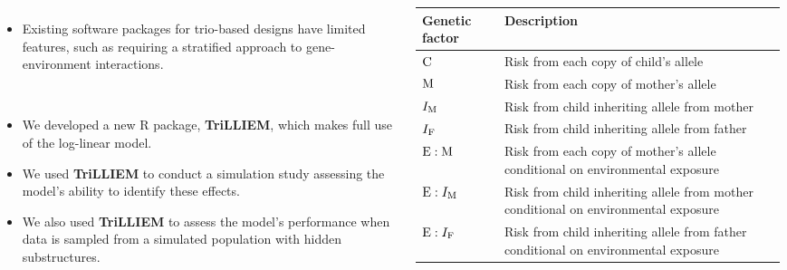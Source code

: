 \documentclass[25pt]{tikzposter}
\newcommand{\MM}{{\rm M}}
\newcommand{\FF}{{\rm F}}
\newcommand{\CC}{{\rm C}}
\newcommand{\EE}{{\rm E}}
\begin{document}
\begin{columns}
{ \vspace{-0.5em}
		\begin{itemize}
			\item \begin{minipage}[t]{0.7\linewidth} Existing software packages for trio-based designs have limited features, such as requiring a stratified approach to gene-environment interactions.\end{minipage} \\
			\item We developed a new \textsf{R} package, \textbf{TriLLIEM}, which makes full use of the log-linear model.
			\item We used \textbf{TriLLIEM} to conduct a simulation study assessing the model's ability to identify these effects.
			\item We also used \textbf{TriLLIEM} to assess the model's performance when data is sampled from a simulated population with hidden substructures.
		\end{itemize}
	}
	{\large
		\renewcommand{\arraystretch}{1.2}
		\centering
		\begin{tabular}{p{1.8in}>{\raggedleft\arraybackslash}p{7.5in}}
	\toprule
	Genetic factor & Description \\
	\midrule
	$\CC$ & Risk from each copy of child's allele \\
	$\MM$ & Risk from each copy of mother's allele \\
	$I_{\MM}$ & Risk from child inheriting allele from mother \\
	$I_{\FF}$ & Risk from child inheriting allele from father \\
	$\EE:\MM$ & Risk from each copy of mother's allele conditional on environmental exposure \\
	$\EE:I_{\MM}$ & Risk from child inheriting allele from mother conditional on environmental exposure \\
	$\EE:I_{\FF}$ & Risk from child inheriting allele from father conditional on environmental exposure \\
	\bottomrule
\end{tabular}

\vspace{2.35em}

}
\end{columns}
\end{document}
